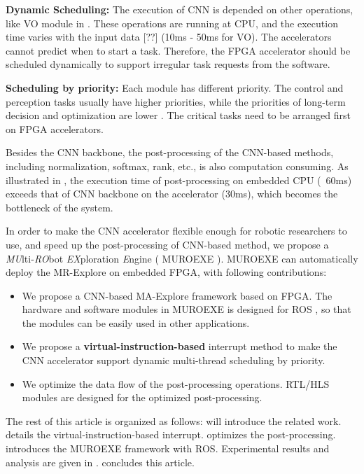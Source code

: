 \textbf{Dynamic Scheduling:} The execution of CNN is depended on other operations, like VO module in . 
These operations are running at CPU, and the execution time varies with the input data [??] (10ms - 50ms for VO). 
The accelerators cannot predict when to start a task. 
Therefore, the FPGA accelerator should be scheduled dynamically to support irregular task requests from the software.

\textbf{Scheduling by priority:} Each module has different priority. The control and perception tasks usually have higher priorities, while the priorities of long-term decision and optimization are lower \cite{RamsauerKLM17}. The critical tasks need to be arranged first on FPGA accelerators.

Besides the CNN backbone, the post-processing of the CNN-based methods, including normalization, softmax, rank, etc., is also computation consuming. As illustrated in , the execution time of post-processing on embedded CPU (~60ms) exceeds that of CNN backbone on the accelerator (30ms), which becomes the bottleneck of the system.


In order to make the CNN accelerator flexible enough for robotic researchers to use, and speed up the post-processing of CNN-based method, we propose a \textit{MU}lti-\textit{RO}bot \textit{EX}ploration \textit{E}ngine ( MUROEXE ). MUROEXE can automatically deploy the MR-Explore on embedded FPGA, with following contributions:

\begin{itemize}
\item We propose a CNN-based MA-Explore framework based on FPGA. The hardware and software modules in MUROEXE is designed for ROS \cite{quigley2009ros}, so that the modules can be easily used in other applications.
\item We propose a \textbf{virtual-instruction-based} interrupt method to make the CNN accelerator support dynamic multi-thread scheduling by priority.
\item We optimize the data flow of the post-processing operations. RTL/HLS modules are designed for the optimized post-processing.
\end{itemize}

The rest of this article is organized as follows:  will introduce the related work.  details the {virtual-instruction-based} interrupt.  optimizes the post-processing.  introduces the MUROEXE framework with ROS. Experimental results and analysis are given in .  concludes this article.